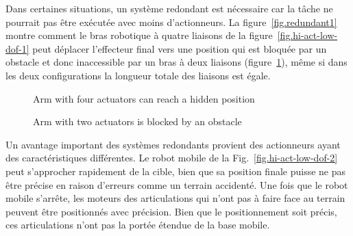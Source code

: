 Dans certaines situations, un système redondant est nécessaire car la tâche ne pourrait pas être exécutée avec moins d'actionneurs. La figure~\ref{fig.redundant1} montre comment le bras robotique à quatre liaisons de la figure~\ref{fig.hi-act-low-dof-1} peut déplacer l'effecteur final vers une position qui est bloquée par un obstacle et donc inaccessible par un bras à deux liaisons (figure~\ref{fig.redundant2}), même si dans les deux configurations la longueur totale des liaisons est égale.

\begin{figure}
\begin{minipage}{.45\textwidth}
\caption{Arm with four actuators can reach a hidden position}\label{fig.redundant1}
\end{minipage}
\hspace{\fill}
\begin{minipage}{.45\textwidth}
\caption{Arm with two actuators is blocked by an obstacle}\label{fig.redundant2}
\end{minipage}
\end{figure}

Un avantage important des systèmes redondants provient des actionneurs ayant des caractéristiques différentes. Le robot mobile de la Fig.~\ref{fig.hi-act-low-dof-2} peut s'approcher rapidement de la cible, bien que sa position finale puisse ne pas être précise en raison d'erreurs comme un terrain accidenté. Une fois que le robot mobile s'arrête, les moteurs des articulations qui n'ont pas à faire face au terrain peuvent être positionnés avec précision. Bien que le positionnement soit précis, ces articulations n'ont pas la portée étendue de la base mobile.


